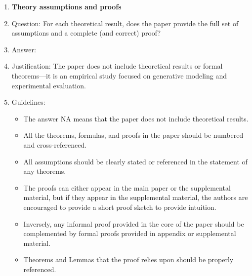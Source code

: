 \documentclass{article}
\theoremstyle{plain}
\theoremstyle{definition}
\theoremstyle{remark}
\begin{document}
{\begin{enumerate}
\item {\bf Theory assumptions and proofs}
    \item[] Question: For each theoretical result, does the paper provide the full set of assumptions and a complete (and correct) proof?
    \item[] Answer: \answerNA{}
    \item[] Justification: The paper does not include theoretical results or formal theorems—it is an empirical study focused on generative modeling and experimental evaluation.
    \item[] Guidelines:
    \begin{itemize}
        \item The answer NA means that the paper does not include theoretical results. 
        \item All the theorems, formulas, and proofs in the paper should be numbered and cross-referenced.
        \item All assumptions should be clearly stated or referenced in the statement of any theorems.
        \item The proofs can either appear in the main paper or the supplemental material, but if they appear in the supplemental material, the authors are encouraged to provide a short proof sketch to provide intuition. 
        \item Inversely, any informal proof provided in the core of the paper should be complemented by formal proofs provided in appendix or supplemental material.
        \item Theorems and Lemmas that the proof relies upon should be properly referenced. 
    \end{itemize}


\end{enumerate}}
\end{document}
